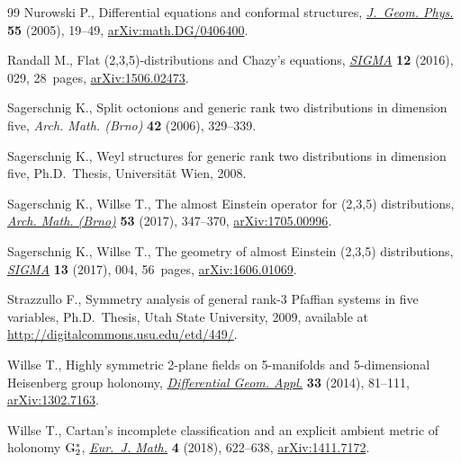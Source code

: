 \documentclass[10pt,a4paper]{amsart}
\numberwithin{equation}{section}
\begin{document}
\begin{thebibliography}{99}
Nurowski P., Differential equations and conformal structures, \href{https://doi.org/10.1016/j.geomphys.2004.11.006}{\textit{J.~Geom.
 Phys.}} \textbf{55} (2005), 19--49, \href{https://arxiv.org/abs/math.DG/0406400}{arXiv:math.DG/0406400}.

Randall M., Flat (2,3,5)-distributions and {C}hazy's equations, \href{https://doi.org/10.3842/SIGMA.2016.029}{\textit{SIGMA}}
 \textbf{12} (2016), 029, 28~pages, \href{https://arxiv.org/abs/1506.02473}{arXiv:1506.02473}.

Sagerschnig K., Split octonions and generic rank two distributions in dimension
 five, \textit{Arch. Math. (Brno)} \textbf{42} (2006), 329--339.

Sagerschnig K., Weyl structures for generic rank two distributions in dimension
 five, Ph.D.~Thesis, {U}niversit\"at Wien, 2008.

Sagerschnig K., Willse T., The almost {E}instein operator for (2,3,5)
 distributions, \href{https://doi.org/10.5817/AM2017-5-347}{\textit{Arch. Math. (Brno)}} \textbf{53} (2017), 347--370,
 \href{https://arxiv.org/abs/1705.00996}{arXiv:1705.00996}.

Sagerschnig K., Willse T., The geometry of almost {E}instein (2,3,5)
 distributions, \href{https://doi.org/10.3842/SIGMA.2017.004}{\textit{SIGMA}} \textbf{13} (2017), 004, 56~pages,
 \href{https://arxiv.org/abs/1606.01069}{arXiv:1606.01069}.

Strazzullo F., Symmetry analysis of general rank-3 {P}faffian systems in five
 variables, Ph.D.~Thesis, {U}tah State University, 2009, available at
 \url{http://digitalcommons.usu.edu/etd/449/}.

Willse T., Highly symmetric 2-plane fields on 5-manifolds and 5-dimensional
 {H}eisenberg group holonomy, \href{https://doi.org/10.1016/j.difgeo.2013.10.010}{\textit{Differential Geom. Appl.}} \textbf{33}
 (2014), 81--111, \href{https://arxiv.org/abs/1302.7163}{arXiv:1302.7163}.

Willse T., Cartan's incomplete classification and an explicit ambient metric of
 holonomy {${\rm G}_2^*$}, \href{https://doi.org/10.1007/s40879-017-0178-9}{\textit{Eur.~J. Math.}} \textbf{4} (2018), 622--638,
 \href{https://arxiv.org/abs/1411.7172}{arXiv:1411.7172}.

\end{thebibliography}
\end{document}
